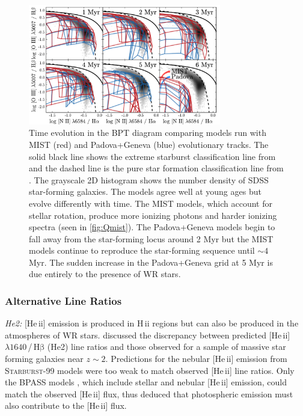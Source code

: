 \documentclass[linenumbers, trackchanges, tighten]{aastex61}%
\newcommand{\Fig}[1]{\autoref{fig:#1}}
\newcommand{\SB}{\textsc{Starburst-99}\xspace}
\newcommand{\heii}{[He\,{\sc ii}]\xspace}
\newcommand{\hb}{\ensuremath{\mathrm{H\beta}}}
\newcommand{\hii}{H\,{\sc ii}\xspace}
\newcommand\lam[1]{\ensuremath{\lambda #1}}
\begin{document}
\begin{figure}[!htbp]
  \begin{centering}
    \includegraphics[width=0.75\textwidth]{f24.pdf}
    \caption{Time evolution in the BPT diagram comparing models run with MIST (red) and Padova+Geneva (blue) evolutionary tracks. The solid black line shows the extreme starburst classification line from \citet{Kewley01} and the dashed line is the pure star formation classification line from \citet{Kauffmann03a}. The  grayscale 2D histogram shows the number density of SDSS star-forming galaxies. The models agree well at young ages but evolve differently with time. The MIST models, which account for stellar rotation, produce more ionizing photons and harder ionizing spectra (seen in \Fig{Qmist}). The Padova+Geneva models begin to fall away from the star-forming locus around 2 Myr but the MIST models continue to reproduce the star-forming sequence until ${\sim}4$ Myr. The sudden increase in the Padova+Geneva grid at 5 Myr is due entirely to the presence of WR stars.}
    \label{fig:BPTmistAge}
  \end{centering}
\end{figure}

\subsubsection{Alternative Line Ratios}

{\it He2:} \heii emission is produced in \hii regions but can also be produced in the atmospheres of WR stars. \citet{Steidel16} discussed the discrepancy between predicted \heii\lam{1640}\,/\,\hb{} (He2) line ratios and those observed for a sample of massive star forming galaxies near $z\sim2$. Predictions for the nebular \heii{} emission from \SB{} models were too weak to match observed \heii{} line ratios. Only the BPASS models \citep{Eldridge12}, which include stellar and nebular \heii{} emission, could match the observed \heii{} flux, thus \citet{Steidel16} deduced that photospheric emission must also contribute to the \heii flux. 
\end{document}
